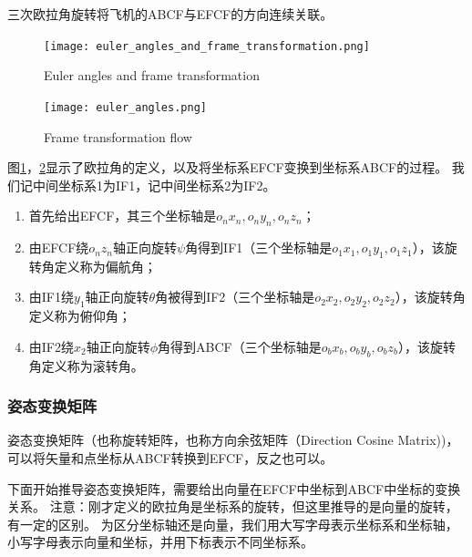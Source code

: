 \documentclass{article} %
\numberwithin{equation}{section} %
\begin{document}
三次欧拉角旋转将飞机的ABCF与EFCF的方向连续关联。
\begin{figure}[H]%
\centering
\texttt{[image: euler\_angles\_and\_frame\_transformation.png]}
\caption{Euler angles and frame transformation}
\label{euler_angles}
\end{figure}

\begin{figure}[H]%
\centering
\texttt{[image: euler\_angles.png]}
\caption{Frame transformation flow}
\label{frame_transformation}
\end{figure}

图\ref{euler_angles}，\ref{frame_transformation}显示了欧拉角的定义，以及将坐标系EFCF变换到坐标系ABCF的过程。
我们记中间坐标系1为IF1，记中间坐标系2为IF2。
\begin{enumerate}
\item 首先给出EFCF，其三个坐标轴是$o_nx_n,o_ny_n,o_nz_n$；
\item 由EFCF绕$o_nz_n$轴正向旋转$\psi$角得到IF1（三个坐标轴是$o_1x_1,o_1y_1,o_1z_1$），该旋转角定义称为偏航角；
\item 由IF1绕$y_1$轴正向旋转$\theta$角被得到IF2（三个坐标轴是$o_2x_2,o_2y_2,o_2z_2$），该旋转角定义称为俯仰角；
\item 由IF2绕$x_2$轴正向旋转$\phi$角得到ABCF（三个坐标轴是$o_bx_b,o_by_b,o_bz_b$），该旋转角定义称为滚转角。
\end{enumerate}

\subsubsection{姿态变换矩阵}
姿态变换矩阵（也称旋转矩阵，也称方向余弦矩阵（Direction Cosine Matrix))，
可以将矢量和点坐标从ABCF转换到EFCF，反之也可以。

下面开始推导姿态变换矩阵，需要给出向量在EFCF中坐标到ABCF中坐标的变换关系。
注意：刚才定义的欧拉角是坐标系的旋转，但这里推导的是向量的旋转，有一定的区别。
为区分坐标轴还是向量，我们用大写字母表示坐标系和坐标轴，小写字母表示向量和坐标，并用下标表示不同坐标系。
\end{document}
